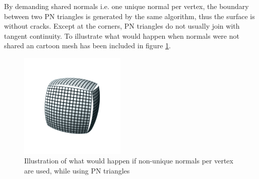 By demanding shared normals i.e. one unique normal per vertex, the boundary between two PN triangles is generated by the same algorithm, thus the surface is without cracks. Except at the corners, PN triangles do not usually join with tangent continuity. To illustrate what would happen when normals were not shared an cartoon mesh has been included in figure \ref{fig:method:cracks}.

\begin{figure}
	\centering
	\includegraphics[width=0.45\textwidth]{./content/img/method/cracks.png}
	\caption{Illustration of what would happen if non-unique normals per vertex are used, while using PN triangles }
	\label{fig:method:cracks}
\end{figure}

